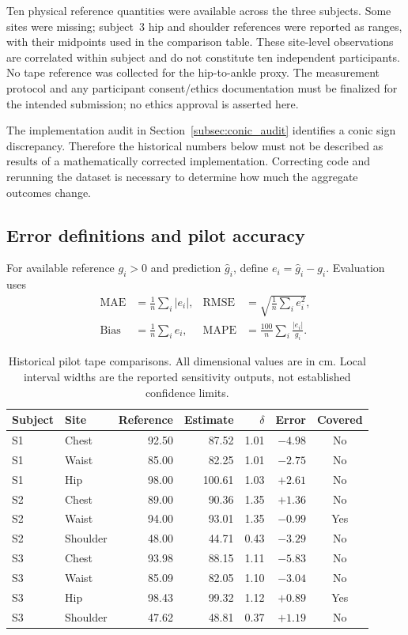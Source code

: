 Ten physical reference quantities were available across the three subjects. Some sites were missing; subject~3 hip and shoulder references were reported as ranges, with their midpoints used in the comparison table. These site-level observations are correlated within subject and do not constitute ten independent participants. No tape reference was collected for the hip-to-ankle proxy. The measurement protocol and any participant consent/ethics documentation must be finalized for the intended submission; no ethics approval is asserted here.

The implementation audit in Section~\ref{subsec:conic_audit} identifies a conic sign discrepancy. Therefore the historical numbers below must not be described as results of a mathematically corrected implementation. Correcting code and rerunning the dataset is necessary to determine how much the aggregate outcomes change.

\subsection{Error definitions and pilot accuracy}
For available reference $g_i>0$ and prediction $\hat g_i$, define $e_i=\hat g_i-g_i$. Evaluation uses
\begin{align}
\operatorname{MAE}&=\frac1n\sum_i|e_i|,&
\operatorname{RMSE}&=\sqrt{\frac1n\sum_i e_i^2},\nonumber\\
\operatorname{Bias}&=\frac1n\sum_i e_i,&
\operatorname{MAPE}&=\frac{100}{n}\sum_i\frac{|e_i|}{g_i}.
\label{eq:error_metrics}
\end{align}
\begin{table}[htbp]
\centering\small
\caption{Historical pilot tape comparisons. All dimensional values are in cm. Local interval widths are the reported sensitivity outputs, not established confidence limits.}
\label{tab:pilot_measurements}
\begin{tabular}{llrrrrc}
\toprule
Subject & Site & Reference & Estimate & $\delta$ & Error & Covered \\
\midrule
S1 & Chest & 92.50 & 87.52 & 1.01 & $-4.98$ & No \\
S1 & Waist & 85.00 & 82.25 & 1.01 & $-2.75$ & No \\
S1 & Hip & 98.00 & 100.61 & 1.03 & $+2.61$ & No \\
S2 & Chest & 89.00 & 90.36 & 1.35 & $+1.36$ & No \\
S2 & Waist & 94.00 & 93.01 & 1.35 & $-0.99$ & Yes \\
S2 & Shoulder & 48.00 & 44.71 & 0.43 & $-3.29$ & No \\
S3 & Chest & 93.98 & 88.15 & 1.11 & $-5.83$ & No \\
S3 & Waist & 85.09 & 82.05 & 1.10 & $-3.04$ & No \\
S3 & Hip & 98.43 & 99.32 & 1.12 & $+0.89$ & Yes \\
S3 & Shoulder & 47.62 & 48.81 & 0.37 & $+1.19$ & No \\
\bottomrule
\end{tabular}
\end{table}

